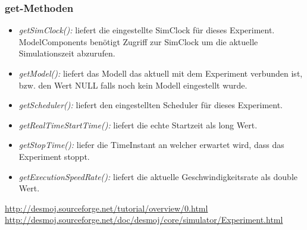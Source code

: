 \documentclass[runningheads]{llncs}
\begin{document}
\subsubsection{get-Methoden}
\begin{itemize}
\item \textit{getSimClock():} liefert die eingestellte SimClock für dieses Experiment. ModelComponents benötigt Zugriff zur SimClock um die aktuelle Simulationszeit abzurufen.
\item \textit{getModel():} liefert das Modell das aktuell mit dem Experiment verbunden ist, bzw. den Wert NULL falls noch kein Modell eingestellt wurde.
\item \textit{getScheduler():} liefert den eingestellten Scheduler für dieses Experiment.
\item \textit{getRealTimeStartTime():} liefert die echte Startzeit als long Wert.
\item \textit{getStopTime():} liefer die TimeInstant an welcher erwartet wird, dass das Experiment stoppt.
\item \textit{getExecutionSpeedRate():} liefert die aktuelle Geschwindigkeitsrate als double Wert.
\end{itemize}
 


 



\begin{thebibliography}{8}
\url{http://desmoj.sourceforge.net/tutorial/overview/0.html}
\url{http://desmoj.sourceforge.net/doc/desmoj/core/simulator/Experiment.html}
\end{thebibliography}
\end{document}

